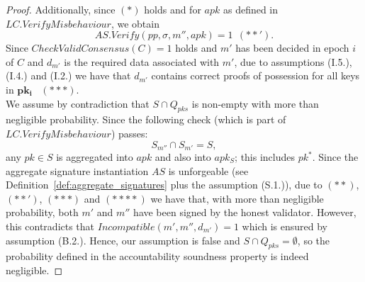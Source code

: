 \begin{proof}
\noindent Additionally, since $(\ast)$ holds and for $\mathit{apk}$ as defined in $\mathit{LC.VerifyMisbehaviour}$, we obtain
$$\mathit{AS.Verify}(\mathit{pp}, \sigma, m'', \mathit{apk}) = 1 \ \ (\ast \ast').$$
\noindent Since $\mathit{CheckValidConsensus}(C) = 1$ holds and $m'$ has been decided in epoch $i$ of $C$ 
and $d_{m'}$ is the required data associated with $m'$, due to assumptions (I.5.), (I.4.) and (I.2.) we have 
that $d_{m'}$ contains correct proofs of possession for all keys in $\mathbf{pk_i}$ \ $(\ast\ast\ast)$. \\ 
\noindent We assume by contradiction that $S \cap Q_{\mathit{pks}}$ is non-empty with more than negligible probability. 
Since the following check (which is part of $\mathit{LC.VerifyMisbehaviour}$) passes:  
$$S_{m''} \cap S_{m'} =S,$$ any $\mathit{pk} \in S$ is aggregated into $\mathit{apk}$ and also into $\mathit{apk_S}$; 
this includes $\mathit{pk^*}$. Since the aggregate signature instantiation $\mathit{AS}$ is unforgeable 
(see Definition~\ref{def:aggregate_signatures} plus the assumption (S.1.)), due to $(\ast\ast)$, $(\ast\ast')$, $(\ast\ast\ast)$ and 
$(\ast\ast\ast\ast)$ we have that, with more than negligible probability, both $m'$ and $m''$ have 
been signed by the honest validator. However, this contradicts that 
$\mathit{Incompatible}(m', m'', d_{m'}) = 1$ which is ensured by assumption (B.2.). Hence, our assumption is false and $S \cap \mathit{Q_{pks}} = \emptyset$, so the 
probability defined in the accountability soundness property is indeed negligible. 

\end{proof}
